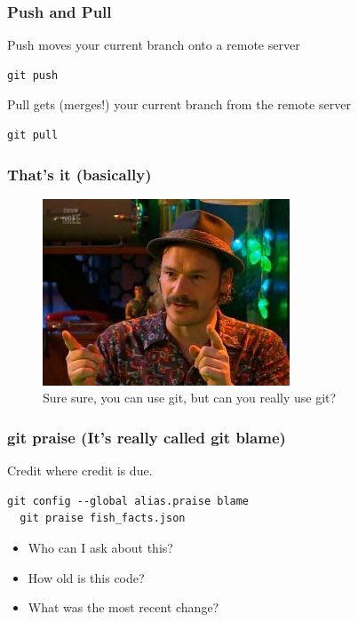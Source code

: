 \documentclass{beamer}
\begin{document}
\begin{frame}[fragile]
\frametitle{Push and Pull}

Push moves your current branch onto a remote server

\vspace{1em}

\begin{lstlisting}[frame=single]
  git push 
\end{lstlisting}

\vspace{1em}

Pull gets (merges!) your current branch from the remote server

\vspace{1em}

\begin{lstlisting}[frame=single]
  git pull 
\end{lstlisting}

\end{frame}

\begin{frame}

\frametitle{That's it (basically)}

\begin{figure}[p]
  \centering
  \includegraphics[height=15em]{howard.jpg}
  \caption{Sure sure, you can use git, but can you really use git?}
\end{figure}

\end{frame}

\begin{frame}[fragile]

\frametitle{git praise (It's really called git blame)}

Credit where credit is due.

\vspace{1em}

\begin{lstlisting}[frame=single]
  git config --global alias.praise blame
  git praise fish_facts.json
\end{lstlisting}

\vspace{1em}

\begin{itemize}
  \item{Who can I ask about this?}
  \item{How old is this code?}
  \item{What was the most recent change?}
\end{itemize}

\end{frame}
\end{document}
